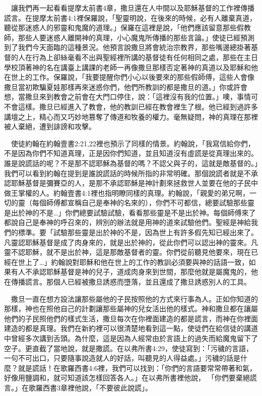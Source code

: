 \documentclass{book}
\begin{document}
　讓我們再一起看看提摩太前書4章，撒旦還在人中間以及耶穌基督的工作裡傳播謊言。在提摩太前書4:1裡保羅說，「聖靈明說，在後來的時候，必有人離棄真道，聽從那迷惑人的邪靈和鬼魔的道理。」保羅在這裡是說，「他們應該留意那些假教師，那些人要迷惑人離開神的真理，小心魔鬼所傳播的那些言論。」使徒已經預測到了我們今天面臨的這種景況。他預言說撒旦將會統治宗教界，那些嘴邊總掛著基督的人在行為上卻絲毫看不出與聖經裡所講的基督徒有任何相同之處，那些在主日學校頂著神的名在講臺上講課的老師一再像撒旦那樣否定著神的真道以及耶穌和他在世上的工作。保羅說，「我要提醒你們小心以後要來的那些假師傅，這些人會像撒旦當初欺騙夏娃那樣再來迷惑你們，他們所教訓的都是撒旦的道。」你或許會想，當撒旦來到教會之前會在大門口停住，說：「這裡沒有我的位置。」噢，事情可不會這樣。撒旦已經進入了教會，他的教訓已經在教會裡生了根。他已經到過許多講壇之上，精心而又巧妙地篡奪了傳道和牧養的權力。毫無疑問，神的真理在那裡被人棄絕，遭到誹謗和攻擊。

　使徒約翰在約翰壹書2:21,22裡也預示了同樣的情景。約翰說，「我寫信給你們，不是因為你們不知道真理，正是因你們知道，並且知道沒有虛謊是從真理出來的。誰是說謊話的呢？不是那不認耶穌為基督的嗎？不認父與子的，這就是敵基督的。」我們可以看到約翰在提到是誰說謊話的時候所指的非常明確。那個說謊者就是不承認耶穌基督是彌賽亞的人，是那不承認耶穌是神計劃來拯救世人並要在他的子民中做王掌權的人。約翰壹書4:1裡也指明瞭同樣的真理。約翰說，「親愛的弟兄啊，一切的靈（每個師傅都宣稱自己是奉神的名來的），你們不可都信，總要試驗那些靈是出於神的不是…」你們總要試驗試驗，看看那些靈是不是出於神。每個師傅來了都說自己是奉神的呼召來的，辨別的辦法就是用神的道來試驗他們。聖經是神給我們的標準。要「試驗那些靈是出於神的不是，因為世上有許多假先知已經出來了。凡靈認耶穌基督是成了肉身來的，就是出於神的，從此你們可以認出神的靈來。凡靈不認耶穌，就不是出於神，這是那敵基督者的靈。你們從前聽見他要來，現在已經在世上了…」約翰說對耶穌和他在世上的工作的教訓必須要與神的話語一致，如果有人不承認耶穌基督是神的兒子，道成肉身來到世間，那麼他就是屬魔鬼的，他在傳播謊言。那個人已經被撒旦誘惑而墮落，並且還成了撒旦誘惑別人的工具。

　撒旦一直在想方設法讓那些屬他的子民按照他的方式來行事為人。正如你知道的那樣，神也在照他自己的計劃讓那些屬神的兒女活出他的樣式。神和撒旦都在讓屬他們的子民照他們的樣式生活，撒旦每次在你裡面建造的都是謊言，而神在你裡面建造的都是真理。我們在新約裡可以很清楚地看到這一點，使徒們在給信徒的講道中曾經多次講到舌頭。為什麼，這是因為人經常由於言語上的過失而給魔鬼留下了空子。更直截了當地說，就是撒謊。在以弗所書4:29，使徒寫到：「污穢的言語，一句不可出口，只要隨事說造就人的好話，叫聽見的人得益處。」污穢的話是什麼？就是謊話！在歌羅西書4:6裡，我們可以找到：「你們的言語要常常帶著和氣，好像用鹽調和，就可知道該怎樣回答各人。」在以弗所書裡他說， 「你們要棄絕謊言。」在歌羅西書3章裡他說，「不要彼此說謊」。
\end{document}
